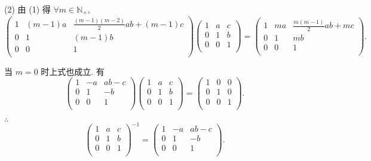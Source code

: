 \documentclass{ctexart}
\begin{document}
\begin{solution}
    (2) 由 (1) 得 $\forall m\in\mathbb{N}_+$,
    \[\begin{pmatrix}
        1 & (m-1)a & \frac{(m-1)(m-2)}{2}ab+(m-1)c \\
        0 & 1 & (m-1)b \\
        0 & 0 & 1 \\
    \end{pmatrix}\begin{pmatrix}
        1 & a & c \\
        0 & 1 & b \\
        0 & 0 & 1 \\
    \end{pmatrix}=\begin{pmatrix}
        1 & ma & \frac{m(m-1)}{2}ab+mc \\
        0 & 1 & mb \\
        0 & 0 & 1 \\
    \end{pmatrix}.\]

    当 $m=0$ 时上式也成立. 有
    \[\begin{pmatrix}
        1 & -a & ab-c \\
        0 & 1 & -b \\
        0 & 0 & 1 \\
    \end{pmatrix}\begin{pmatrix}
        1 & a & c \\
        0 & 1 & b \\
        0 & 0 & 1 \\
    \end{pmatrix}=\begin{pmatrix}
        1 & 0 & 0 \\
        0 & 1 & 0 \\
        0 & 0 & 1 \\
    \end{pmatrix}.\]

    $\therefore$
    \[\begin{pmatrix}
        1 & a & c \\
        0 & 1 & b \\
        0 & 0 & 1 \\
    \end{pmatrix}^{-1}=\begin{pmatrix}
        1 & -a & ab-c \\
        0 & 1 & -b \\
        0 & 0 & 1 \\
    \end{pmatrix}.\]
\end{solution}
\end{document}
